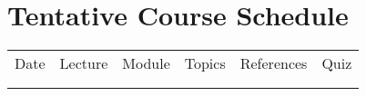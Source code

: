 \documentclass{./../Latex/syllabus}
\begin{document}
\section*{\centering Tentative Course Schedule} \vspace{1em}
{\renewcommand{\arraystretch}{1.15}
\begin{center}
\begin{tabularx}{1\textwidth}{|C{1.15cm}|C{1.4cm}|C{2.7cm}|X|p{3cm}|C{1.25cm}|}
\Xhline{1.75\arrayrulewidth}
Date & Lecture & Module & Topics  & References & Quiz  \\
\Xhline{1.75\arrayrulewidth}
 \\
\Xhline{1.75\arrayrulewidth}
\end{tabularx}
\end{center}
\restoregeometry 

%


}
\end{document}
